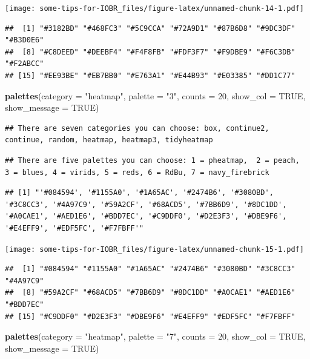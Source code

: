 \documentclass[
  12pt,
]{book}
\newenvironment{Shaded}{\begin{snugshade}}{\end{snugshade}}
\newcommand{\AttributeTok}[1]{\textcolor[rgb]{0.13,0.29,0.53}{#1}}
\newcommand{\ConstantTok}[1]{\textcolor[rgb]{0.56,0.35,0.01}{#1}}
\newcommand{\DecValTok}[1]{\textcolor[rgb]{0.00,0.00,0.81}{#1}}
\newcommand{\FunctionTok}[1]{\textcolor[rgb]{0.13,0.29,0.53}{\textbf{#1}}}
\newcommand{\NormalTok}[1]{#1}
\newcommand{\StringTok}[1]{\textcolor[rgb]{0.31,0.60,0.02}{#1}}
\begin{document}
\texttt{[image: some-tips-for-IOBR\_files/figure-latex/unnamed-chunk-14-1.pdf]}

\begin{verbatim}
##  [1] "#3182BD" "#468FC3" "#5C9CCA" "#72A9D1" "#87B6D8" "#9DC3DF" "#B3D0E6"
##  [8] "#C8DEED" "#DEEBF4" "#F4F8FB" "#FDF3F7" "#F9DBE9" "#F6C3DB" "#F2ABCC"
## [15] "#EE93BE" "#EB7BB0" "#E763A1" "#E44B93" "#E03385" "#DD1C77"
\end{verbatim}

\begin{Shaded}
\begin{Highlighting}[]
\FunctionTok{palettes}\NormalTok{(}\AttributeTok{category =} \StringTok{"heatmap"}\NormalTok{, }\AttributeTok{palette =} \StringTok{"3"}\NormalTok{, }\AttributeTok{counts =} \DecValTok{20}\NormalTok{, }\AttributeTok{show\_col =} \ConstantTok{TRUE}\NormalTok{, }\AttributeTok{show\_message =} \ConstantTok{TRUE}\NormalTok{)}
\end{Highlighting}
\end{Shaded}

\begin{verbatim}
## There are seven categories you can choose: box, continue2, continue, random, heatmap, heatmap3, tidyheatmap
\end{verbatim}

\begin{verbatim}
## There are five palettes you can choose: 1 = pheatmap,  2 = peach,  3 = blues, 4 = virids, 5 = reds, 6 = RdBu, 7 = navy_firebrick
\end{verbatim}

\begin{verbatim}
## [1] "'#084594', '#1155A0', '#1A65AC', '#2474B6', '#3080BD', '#3C8CC3', '#4A97C9', '#59A2CF', '#68ACD5', '#7BB6D9', '#8DC1DD', '#A0CAE1', '#AED1E6', '#BDD7EC', '#C9DDF0', '#D2E3F3', '#DBE9F6', '#E4EFF9', '#EDF5FC', '#F7FBFF'"
\end{verbatim}

\texttt{[image: some-tips-for-IOBR\_files/figure-latex/unnamed-chunk-15-1.pdf]}

\begin{verbatim}
##  [1] "#084594" "#1155A0" "#1A65AC" "#2474B6" "#3080BD" "#3C8CC3" "#4A97C9"
##  [8] "#59A2CF" "#68ACD5" "#7BB6D9" "#8DC1DD" "#A0CAE1" "#AED1E6" "#BDD7EC"
## [15] "#C9DDF0" "#D2E3F3" "#DBE9F6" "#E4EFF9" "#EDF5FC" "#F7FBFF"
\end{verbatim}

\begin{Shaded}
\begin{Highlighting}[]
\FunctionTok{palettes}\NormalTok{(}\AttributeTok{category =} \StringTok{"heatmap"}\NormalTok{, }\AttributeTok{palette =} \StringTok{"7"}\NormalTok{, }\AttributeTok{counts =} \DecValTok{20}\NormalTok{, }\AttributeTok{show\_col =} \ConstantTok{TRUE}\NormalTok{, }\AttributeTok{show\_message =} \ConstantTok{TRUE}\NormalTok{)}
\end{Highlighting}
\end{Shaded}
\end{document}
